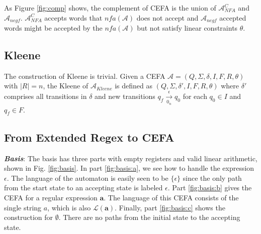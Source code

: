 \documentclass[sigconf]{acmart}
\newcommand*{\lan}{\mathcal{L}}
\newcommand*{\highlight}[1]{\textbf{\textit{#1}}}
\newcommand*{\aut}{\mathcal{A}}
\begin{document}
As Figure \ref{fig:comp} shows, the complement of CEFA is the union of $\aut_{NFA}^C$ and $\aut_{negf}$. $\aut_{NFA}^C$ accepts words that $nfa(\aut)$ does not accept and $\aut_{negf}$ accepted words might be accepted by the $nfa(\aut)$ but not satisfy linear constraints $\theta$.
\subsection{Kleene}\label{subsec:klee}
The construction of Kleene is trivial. Given a CEFA $\aut = (Q,\Sigma,\delta,I,F,R,\theta)$ with $|R|=n$, the Kleene of $\aut_{Kleene}$ is defined as $(Q,\Sigma,\delta',I,F,R,\theta)$ where $\delta'$ comprises all transitions in $\delta$ and new transitions $q_f\xrightarrow[0_n]{\epsilon} q_0$ for each $q_0\in I$ and $q_f\in F$.

\subsection{From Extended Regex to CEFA} \label{subsec:regex2cefa}
\highlight{Basis}: The basis has three parts with empty registers and valid linear arithmetic, shown in Fig. \ref{fig:basis}. In part \ref{fig:basis:a}, we see how to handle the expression $\epsilon$. The language of the automaton is easily seen to be $\{\epsilon\}$ since the only path from the start state to an accepting state
is labeled $\epsilon$. Part \ref{fig:basis:b} gives the CEFA for a regular expression $\mathbf{a}$. The language of this CEFA consists of the single string $a$, which is also $\lan(\mathbf{a})$. Finally, part \ref{fig:basis:c} shows the construction for $\emptyset$. There are no paths from the initial state to the accepting state.
\end{document}
